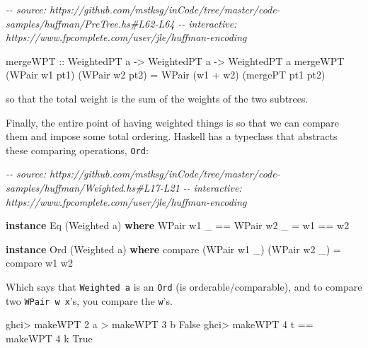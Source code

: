 \documentclass[]{article}
\newenvironment{Shaded}{}{}
\newcommand{\CharTok}[1]{\textcolor[rgb]{0.25,0.44,0.63}{#1}}
\newcommand{\CommentTok}[1]{\textcolor[rgb]{0.38,0.63,0.69}{\textit{#1}}}
\newcommand{\DataTypeTok}[1]{\textcolor[rgb]{0.56,0.13,0.00}{#1}}
\newcommand{\DecValTok}[1]{\textcolor[rgb]{0.25,0.63,0.44}{#1}}
\newcommand{\FunctionTok}[1]{\textcolor[rgb]{0.02,0.16,0.49}{#1}}
\newcommand{\KeywordTok}[1]{\textcolor[rgb]{0.00,0.44,0.13}{\textbf{#1}}}
\newcommand{\NormalTok}[1]{#1}
\newcommand{\OperatorTok}[1]{\textcolor[rgb]{0.40,0.40,0.40}{#1}}
\newcommand{\OtherTok}[1]{\textcolor[rgb]{0.00,0.44,0.13}{#1}}
\begin{document}
\begin{Shaded}
\begin{Highlighting}[]
\CommentTok{{-}{-} source: https://github.com/mstksg/inCode/tree/master/code{-}samples/huffman/PreTree.hs\#L62{-}L64}
\CommentTok{{-}{-} interactive: https://www.fpcomplete.com/user/jle/huffman{-}encoding}

\OtherTok{mergeWPT ::} \DataTypeTok{WeightedPT}\NormalTok{ a }\OtherTok{{-}>} \DataTypeTok{WeightedPT}\NormalTok{ a }\OtherTok{{-}>} \DataTypeTok{WeightedPT}\NormalTok{ a}
\NormalTok{mergeWPT (}\DataTypeTok{WPair}\NormalTok{ w1 pt1) (}\DataTypeTok{WPair}\NormalTok{ w2 pt2)}
    \OtherTok{=} \DataTypeTok{WPair}\NormalTok{ (w1 }\OperatorTok{+}\NormalTok{ w2) (mergePT pt1 pt2)}
\end{Highlighting}
\end{Shaded}

so that the total weight is the sum of the weights of the two subtrees.

Finally, the entire point of having weighted things is so that we can compare
them and impose some total ordering. Haskell has a typeclass that abstracts
these comparing operations, \texttt{Ord}:

\begin{Shaded}
\begin{Highlighting}[]
\CommentTok{{-}{-} source: https://github.com/mstksg/inCode/tree/master/code{-}samples/huffman/Weighted.hs\#L17{-}L21}
\CommentTok{{-}{-} interactive: https://www.fpcomplete.com/user/jle/huffman{-}encoding}

\KeywordTok{instance} \DataTypeTok{Eq}\NormalTok{ (}\DataTypeTok{Weighted}\NormalTok{ a) }\KeywordTok{where}
    \DataTypeTok{WPair}\NormalTok{ w1 \_ }\OperatorTok{==} \DataTypeTok{WPair}\NormalTok{ w2 \_ }\OtherTok{=}\NormalTok{ w1 }\OperatorTok{==}\NormalTok{ w2}

\KeywordTok{instance} \DataTypeTok{Ord}\NormalTok{ (}\DataTypeTok{Weighted}\NormalTok{ a) }\KeywordTok{where}
    \FunctionTok{compare}\NormalTok{ (}\DataTypeTok{WPair}\NormalTok{ w1 \_) (}\DataTypeTok{WPair}\NormalTok{ w2 \_) }\OtherTok{=} \FunctionTok{compare}\NormalTok{ w1 w2}
\end{Highlighting}
\end{Shaded}

Which says that \texttt{Weighted\ a} is an \texttt{Ord} (is
orderable/comparable), and to compare two \texttt{WPair\ w\ x}'s, you compare
the \texttt{w}'s.

\begin{Shaded}
\begin{Highlighting}[]
\NormalTok{ghci}\OperatorTok{>}\NormalTok{ makeWPT }\DecValTok{2} \CharTok{\textquotesingle{}a\textquotesingle{}} \OperatorTok{>}\NormalTok{ makeWPT }\DecValTok{3} \CharTok{\textquotesingle{}b\textquotesingle{}}
\DataTypeTok{False}
\NormalTok{ghci}\OperatorTok{>}\NormalTok{ makeWPT }\DecValTok{4} \CharTok{\textquotesingle{}t\textquotesingle{}} \OperatorTok{==}\NormalTok{ makeWPT }\DecValTok{4} \CharTok{\textquotesingle{}k\textquotesingle{}}
\DataTypeTok{True}
\end{Highlighting}
\end{Shaded}
\end{document}
